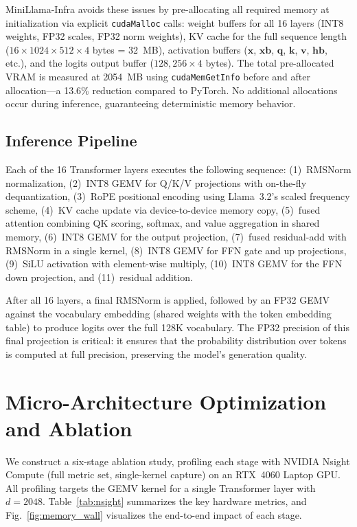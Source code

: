 \documentclass[conference]{IEEEtran}
\begin{document}
MiniLlama-Infra avoids these issues by pre-allocating all required memory at initialization via explicit \texttt{cudaMalloc} calls: weight buffers for all 16 layers (INT8 weights, FP32 scales, FP32 norm weights), KV cache for the full sequence length ($16 \times 1024 \times 512 \times 4$ bytes = 32~MB), activation buffers ($\mathbf{x}$, $\mathbf{xb}$, $\mathbf{q}$, $\mathbf{k}$, $\mathbf{v}$, $\mathbf{hb}$, etc.), and the logits output buffer ($128{,}256 \times 4$ bytes). The total pre-allocated VRAM is measured at 2054~MB using \texttt{cudaMemGetInfo} before and after allocation---a 13.6\% reduction compared to PyTorch. No additional allocations occur during inference, guaranteeing deterministic memory behavior.

\subsection{Inference Pipeline}
Each of the 16 Transformer layers executes the following sequence: (1)~RMSNorm normalization, (2)~INT8 GEMV for Q/K/V projections with on-the-fly dequantization, (3)~RoPE positional encoding using Llama~3.2's scaled frequency scheme, (4)~KV cache update via device-to-device memory copy, (5)~fused attention combining QK scoring, softmax, and value aggregation in shared memory, (6)~INT8 GEMV for the output projection, (7)~fused residual-add with RMSNorm in a single kernel, (8)~INT8 GEMV for FFN gate and up projections, (9)~SiLU activation with element-wise multiply, (10)~INT8 GEMV for the FFN down projection, and (11)~residual addition.

After all 16 layers, a final RMSNorm is applied, followed by an FP32 GEMV against the vocabulary embedding (shared weights with the token embedding table) to produce logits over the full 128K vocabulary. The FP32 precision of this final projection is critical: it ensures that the probability distribution over tokens is computed at full precision, preserving the model's generation quality.

\section{Micro-Architecture Optimization and Ablation}

We construct a six-stage ablation study, profiling each stage with NVIDIA Nsight Compute (full metric set, single-kernel capture) on an RTX~4060 Laptop GPU. All profiling targets the GEMV kernel for a single Transformer layer with $d=2048$. Table~\ref{tab:nsight} summarizes the key hardware metrics, and Fig.~\ref{fig:memory_wall} visualizes the end-to-end impact of each stage.
\end{document}
